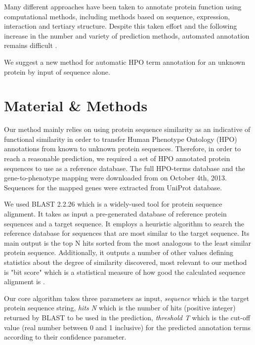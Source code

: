 \documentclass{bioinfo}
\begin{document}
Many different approaches have been taken to annotate protein function using computational methods, including methods based on sequence, expression, interaction and tertiary structure. Despite this taken effort and the following increase in the number and variety of prediction methods, automated annotation remains difficult \citep{Rodrigues07}.

We suggest a new method for automatic HPO term annotation for an unknown protein by input of sequence alone.

\section{Material \& Methods}

Our method mainly relies on using protein sequence similarity as an indicative of functional similarity in order to transfer Human Phenotype Ontology (HPO) annotations from known to unknown protein sequences. Therefore, in order to reach a reasonable prediction, we required a set of HPO annotated protein sequences to use as a reference database. The full HPO-terms database and the gene-to-phenotype mapping were downloaded from \cite{hpodb} on October 4th, 2013. Sequences for the mapped genes were extracted from UniProt \cite{uniprot} database.

We used BLAST 2.2.26 \cite{blastweb} which is a widely-used tool for protein sequence alignment. It takes as input a pre-generated database of reference protein sequences and a target sequence. It employs a heuristic algorithm to search the reference database for sequences that are most similar to the target sequence. Its main output is the top N hits sorted from the most analogous to the least similar protein sequence. Additionally, it outputs a number of other values defining statistics about the degree of similarity discovered, most relevant to our method is "bit score" which is a statistical measure of how good the calculated sequence alignment is \cite{blastscore}.

Our core algorithm takes three parameters as input, \textit{sequence} which is the target protein sequence string, \textit{hits N} which is the number of hits (positive integer) returned by BLAST to be used in the prediction, \textit{threshold T} which is the cut-off value (real number between 0 and 1 inclusive) for the predicted annotation terms according to their confidence parameter.
\end{document}
